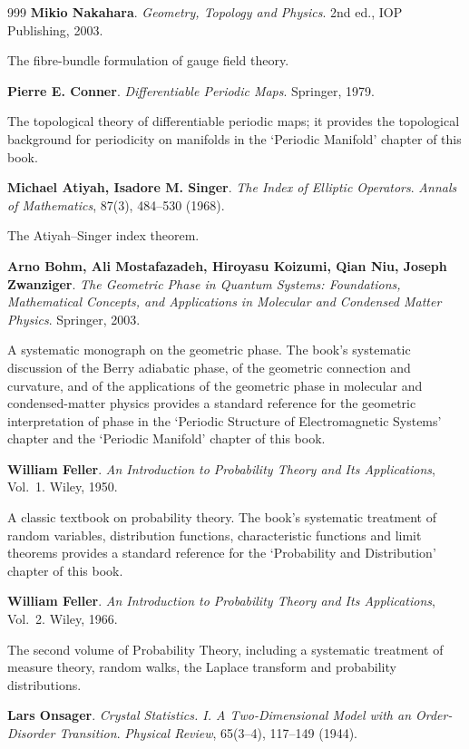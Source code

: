 \begin{thebibliography}{999}
 \textbf{Mikio Nakahara}. \textit{Geometry, Topology and Physics}. 2nd ed., IOP Publishing, 2003.

The fibre-bundle formulation of gauge field theory.

 \textbf{Pierre E. Conner}. \textit{Differentiable Periodic Maps}. Springer, 1979.

The topological theory of differentiable periodic maps; it provides the topological background for periodicity on manifolds in the `Periodic Manifold' chapter of this book.

 \textbf{Michael Atiyah, Isadore M. Singer}. \textit{The Index of Elliptic Operators}. \textit{Annals of Mathematics}, 87(3), 484--530 (1968).

The Atiyah--Singer index theorem.

 \textbf{Arno Bohm, Ali Mostafazadeh, Hiroyasu Koizumi, Qian Niu, Joseph Zwanziger}. \textit{The Geometric Phase in Quantum Systems: Foundations, Mathematical Concepts, and Applications in Molecular and Condensed Matter Physics}. Springer, 2003.

A systematic monograph on the geometric phase. The book's systematic discussion of the Berry adiabatic phase, of the geometric connection and curvature, and of the applications of the geometric phase in molecular and condensed-matter physics provides a standard reference for the geometric interpretation of phase in the `Periodic Structure of Electromagnetic Systems' chapter and the `Periodic Manifold' chapter of this book.

 \textbf{William Feller}. \textit{An Introduction to Probability Theory and Its Applications}, Vol.~1. Wiley, 1950.

A classic textbook on probability theory. The book's systematic treatment of random variables, distribution functions, characteristic functions and limit theorems provides a standard reference for the `Probability and Distribution' chapter of this book.

 \textbf{William Feller}. \textit{An Introduction to Probability Theory and Its Applications}, Vol.~2. Wiley, 1966.

The second volume of Probability Theory, including a systematic treatment of measure theory, random walks, the Laplace transform and probability distributions.

 \textbf{Lars Onsager}. \textit{Crystal Statistics. I. A Two-Dimensional Model with an Order-Disorder Transition}. \textit{Physical Review}, 65(3--4), 117--149 (1944).


\end{thebibliography}
